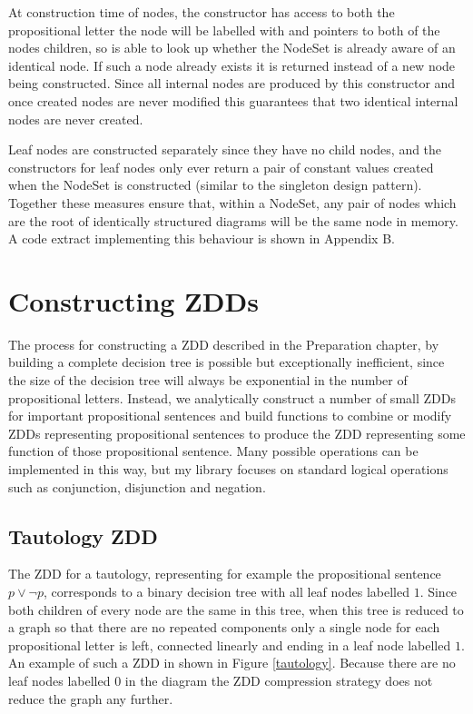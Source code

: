 \documentclass[12pt,a4paper,twoside,openright]{report}
\begin{document}
At construction time of nodes, the constructor has access to both the propositional letter the node will be labelled with and pointers to both of the nodes children, so is able to look up whether the NodeSet is already aware of an identical node. If such a node already exists it is returned instead of a new node being constructed. Since all internal nodes are produced by this constructor and once created nodes are never modified this guarantees that two identical internal nodes are never created.

Leaf nodes are constructed separately since they have no child nodes, and the constructors for leaf nodes only ever return a pair of constant values created when the NodeSet is constructed (similar to the singleton design pattern). Together these measures ensure that, within a NodeSet, any pair of nodes which are the root of identically structured diagrams will be the same node in memory. A code extract implementing this behaviour is shown in Appendix B.

\section{Constructing ZDDs}
The process for constructing a ZDD described in the Preparation chapter, by building a complete decision tree is possible but exceptionally inefficient, since the size of the decision tree will always be exponential in the number of propositional letters. Instead, we analytically construct a number of small ZDDs for important propositional sentences and build functions to combine or modify ZDDs representing propositional sentences to produce the ZDD representing some function of those propositional sentence. Many possible operations can be implemented in this way, but my library focuses on standard logical operations such as conjunction, disjunction and negation.

\subsection{Tautology ZDD}
The ZDD for a tautology, representing for example the propositional sentence $p\vee\neg p$, corresponds to a binary decision tree with all leaf nodes labelled $1$. Since both children of every node are the same in this tree, when this tree is reduced to a graph so that there are no repeated components only a single node for each propositional letter is left, connected linearly and ending in a leaf node labelled $1$. An example of such a ZDD in shown in Figure \ref{tautology}. Because there are no leaf nodes labelled $0$ in the diagram the ZDD compression strategy does not reduce the graph any further.
\end{document}
